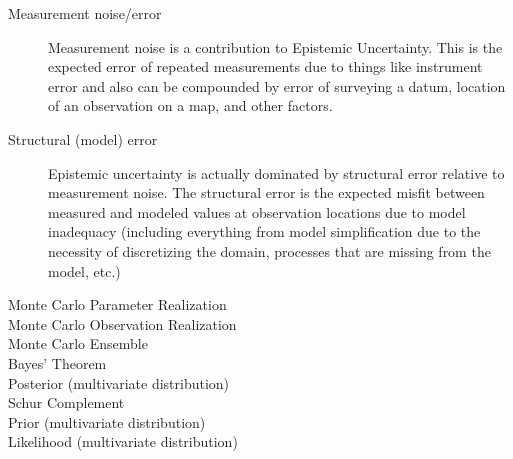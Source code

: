 \documentclass[english]{article}
\begin{document}
\begin{description}
\item [Measurement noise/error] Measurement noise is a contribution to Epistemic Uncertainty. This is the expected error of repeated measurements due to things like instrument error and also can be compounded by error of surveying a datum, location of an observation on a map, and other factors. 
\item [Structural (model) error] Epistemic uncertainty is actually dominated by structural error relative to measurement noise. The structural error is the expected misfit between measured and modeled values at observation locations due to model inadequacy (including everything from model simplification due to the necessity of discretizing the domain, processes that are missing from the model, etc.)
\item [Monte Carlo Parameter Realization] 
\item [Monte Carlo Observation Realization] 
\item [Monte Carlo Ensemble] 
\item [Bayes' Theorem]
\item [Posterior (multivariate distribution)]
\item [Schur Complement]
\item [Prior (multivariate distribution)]
\item [Likelihood (multivariate distribution)] 

\end{description}
\end{document}
